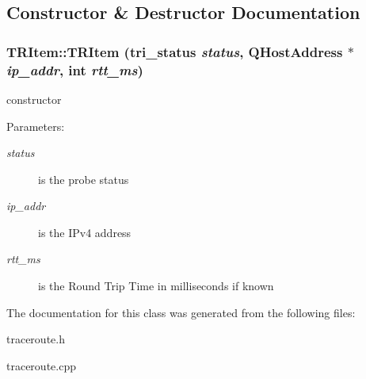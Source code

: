 \subsection{Constructor \& Destructor Documentation}
\hypertarget{classTRItem_6905eecc9647dcd715ab346e7234ffdc}{
\subsubsection[TRItem]{\setlength{\rightskip}{0pt plus 5cm}TRItem::TRItem ({\bf tri\_\-status} {\em status}, \/  QHostAddress $\ast$ {\em ip\_\-addr}, \/  int {\em rtt\_\-ms})}}
\label{classTRItem_6905eecc9647dcd715ab346e7234ffdc}


constructor \begin{Desc}
\item[Parameters:]
\begin{description}
\item[{\em status}]is the probe status \item[{\em ip\_\-addr}]is the IPv4 address \item[{\em rtt\_\-ms}]is the Round Trip Time in milliseconds if known \end{description}
\end{Desc}


The documentation for this class was generated from the following files:\begin{CompactItemize}
\item 
traceroute.h\item 
traceroute.cpp\end{CompactItemize}
